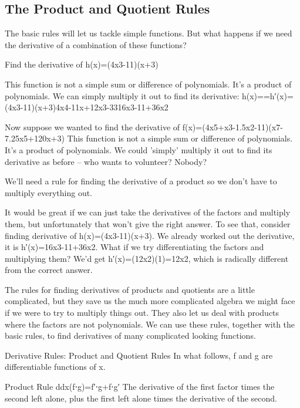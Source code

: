 \begin{example} \section{The Product and Quotient Rules}
\label{sec:prod-quot}

The basic rules will let us tackle simple functions. But what happens if we need the derivative of a combination of these functions?

\begin{example}
  \label{ex:2-8-1}
Find the derivative of h(x)=(4x3-11)(x+3)
\begin{solution} This function is not a simple sum or difference of polynomials. It’s a product of polynomials. We can simply multiply it out to find its derivative:
h(x)==h′(x)=(4x3-11)(x+3)4x4-11x+12x3-3316x3-11+36x2
\end{solution}\end{example}

Now suppose we wanted to find the derivative of
f(x)=(4x5+x3-1.5x2-11)(x7-7.25x5+120x+3)
This function is not a simple sum or difference of polynomials. It’s a product of polynomials. We could 'simply' multiply it out to find its derivative as before – who wants to volunteer? Nobody?

We’ll need a rule for finding the derivative of a product so we don’t have to multiply everything out.

It would be great if we can just take the derivatives of the factors and multiply them, but unfortunately that won’t give the right answer. To see that, consider finding derivative of h(x)=(4x3-11)(x+3). We already worked out the derivative, it is h′(x)=16x3-11+36x2. What if we try differentiating the factors and multiplying them? We’d get h′(x)=(12x2)(1)=12x2, which is radically different from the correct answer.

The rules for finding derivatives of products and quotients are a little complicated, but they save us the much more complicated algebra we might face if we were to try to multiply things out. They also let us deal with products where the factors are not polynomials. We can use these rules, together with the basic rules, to find derivatives of many complicated looking functions.

Derivative Rules: Product and Quotient Rules
In what follows, f and g are differentiable functions of x.

Product Rule
ddx(f⋅g)=f′⋅g+f⋅g′
The derivative of the first factor times the second left alone, plus the first left alone times the derivative of the second.


\end{example}

